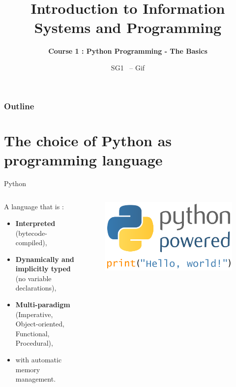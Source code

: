 \documentclass[compress, color = usenames, dvipsnames]{beamer}
\title[Information Systems \& Programming]{Introduction to Information Systems and Programming}
\subtitle[]{\Large \textbf{Course 1 : Python Programming - The Basics}}
\date[SG1 ~-- Gif]{\large SG1 ~-- Gif}
\institute[]{\large CentraleSupélec -- Gif}
\begin{document}
\frame{
  \titlepage
}

\begin{frame}
  \frametitle{Outline}
  \linespread{1.4}
  \tableofcontents[sections={1-4}, subsectionstyle=hide]
\end{frame}

\section[Why Python ?]{The choice of Python as programming language}

\begin{frame}{Python}
\begin{columns}    
\begin{column}{0.7\textwidth}
\begin{block}{A language that is :}
\begin{itemize}
    \item \textbf{Interpreted} (bytecode-compiled),
    \item \textbf{Dynamically and implicitly typed} (no variable declarations),
    \item \textbf{Multi-paradigm} (Imperative, Object-oriented, Functional, Procedural),
    \item with automatic memory management.
\end{itemize}
\end{block}
\end{column}

\begin{column}{0.4\textwidth}
\begin{figure}
\includegraphics[scale=0.05]{./Images/python.png}
\end{figure}
\end{column}
\end{columns}
\end{frame}
\end{document}
